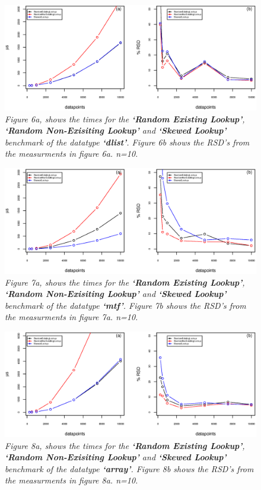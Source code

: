 \documentclass[a4paper,11pt,twoside]{article}
\begin{document}
\begin{figure}[H] 
\centering 
\includegraphics[width=\textwidth]{figures/fig6.eps}
\caption{\textit{Figure 6a, shows the times for the \textbf{`Random Existing
    Lookup'}, \textbf{`Random Non-Exisiting Lookup'} and
  \textbf{`Skewed Lookup'} benchmark of the datatype \textbf{`dlist'}. Figure 6b shows the RSD's from the measurments
in figure 6a. n=10.}}
\end{figure}

\begin{figure}[H] 
\centering 
\includegraphics[width=\textwidth]{figures/fig7.eps}
\caption{\textit{Figure 7a, shows the times for the \textbf{`Random Existing
    Lookup'}, \textbf{`Random Non-Exisiting Lookup'} and
  \textbf{`Skewed Lookup'} benchmark of the datatype \textbf{`mtf'}. Figure 7b shows the RSD's from the measurments
in figure 7a. n=10.}}
\end{figure}

\begin{figure}[H] 
\centering 
\includegraphics[width=\textwidth]{figures/fig8.eps}
\caption{\textit{Figure 8a, shows the times for the \textbf{`Random Existing
    Lookup'}, \textbf{`Random Non-Exisiting Lookup'} and
  \textbf{`Skewed Lookup'} benchmark of the datatype \textbf{`array'}. Figure 8b shows the RSD's from the measurments
in figure 8a. n=10.}}
\end{figure}
\end{document}
